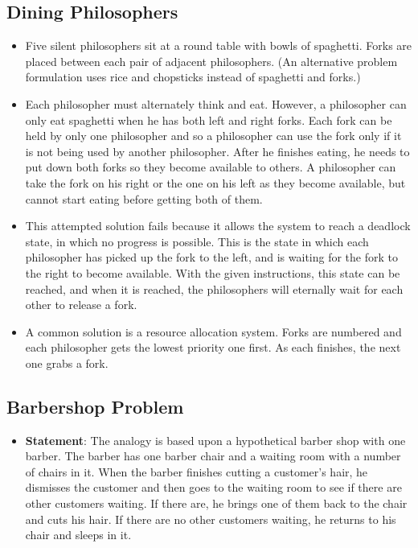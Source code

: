 \documentclass[fontsize=5pt]{scrartcl}
\begin{document}
\begin{multicols}{3}
\begin{itemize}
        \end{itemize}

      \subsection{Dining Philosophers}
        \begin{itemize}
          \item Five silent philosophers sit at a round table with bowls of spaghetti. Forks are placed between each pair of adjacent philosophers. (An alternative problem formulation uses rice and chopsticks instead of spaghetti and forks.)
          \item Each philosopher must alternately think and eat. However, a philosopher can only eat spaghetti when he has both left and right forks. Each fork can be held by only one philosopher and so a philosopher can use the fork only if it is not being used by another philosopher. After he finishes eating, he needs to put down both forks so they become available to others. 
                A philosopher can take the fork on his right or the one on his left as they become available, but cannot start eating before getting both of them.
          \item This attempted solution fails because it allows the system to reach a deadlock state, in which no progress is possible. This is the state in which each philosopher has picked up the fork to the left, and is waiting for the fork to the right to become available. 
                With the given instructions, this state can be reached, and when it is reached, the philosophers will eternally wait for each other to release a fork.
          \item A common solution is a resource allocation system. Forks are numbered and each philosopher gets the lowest priority one first. As each finishes, the next one grabs a fork.
        \end{itemize}

      \subsection{Barbershop Problem}
        \begin{itemize}
          \item \textbf{Statement}: The analogy is based upon a hypothetical barber shop with one barber. The barber has one barber chair and a waiting room with a number of chairs in it. When the barber finishes cutting a customer's hair, he dismisses the customer and then goes to the waiting room to see if there are other customers waiting. 
                                    If there are, he brings one of them back to the chair and cuts his hair. If there are no other customers waiting, he returns to his chair and sleeps in it.
        \end{itemize}
      

\end{multicols}
\end{document}
